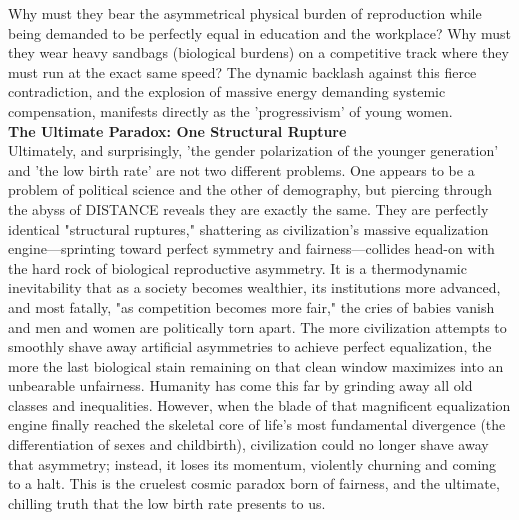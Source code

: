Why must they bear the asymmetrical physical burden of reproduction while being demanded to be perfectly equal in education and the workplace? Why must they wear heavy sandbags (biological burdens) on a competitive track where they must run at the exact same speed? The dynamic backlash against this fierce contradiction, and the explosion of massive energy demanding systemic compensation, manifests directly as the 'progressivism' of young women. \\
\textbf{The Ultimate Paradox: One Structural Rupture} \\
Ultimately, and surprisingly, 'the gender polarization of the younger generation' and 'the low birth rate' are not two different problems. One appears to be a problem of political science and the other of demography, but piercing through the abyss of DISTANCE reveals they are exactly the same. They are perfectly identical "structural ruptures," shattering as civilization's massive equalization engine—sprinting toward perfect symmetry and fairness—collides head-on with the hard rock of biological reproductive asymmetry.
It is a thermodynamic inevitability that as a society becomes wealthier, its institutions more advanced, and most fatally, "as competition becomes more fair," the cries of babies vanish and men and women are politically torn apart. The more civilization attempts to smoothly shave away artificial asymmetries to achieve perfect equalization, the more the last biological stain remaining on that clean window maximizes into an unbearable unfairness.
Humanity has come this far by grinding away all old classes and inequalities. However, when the blade of that magnificent equalization engine finally reached the skeletal core of life's most fundamental divergence (the differentiation of sexes and childbirth), civilization could no longer shave away that asymmetry; instead, it loses its momentum, violently churning and coming to a halt. This is the cruelest cosmic paradox born of fairness, and the ultimate, chilling truth that the low birth rate presents to us.
